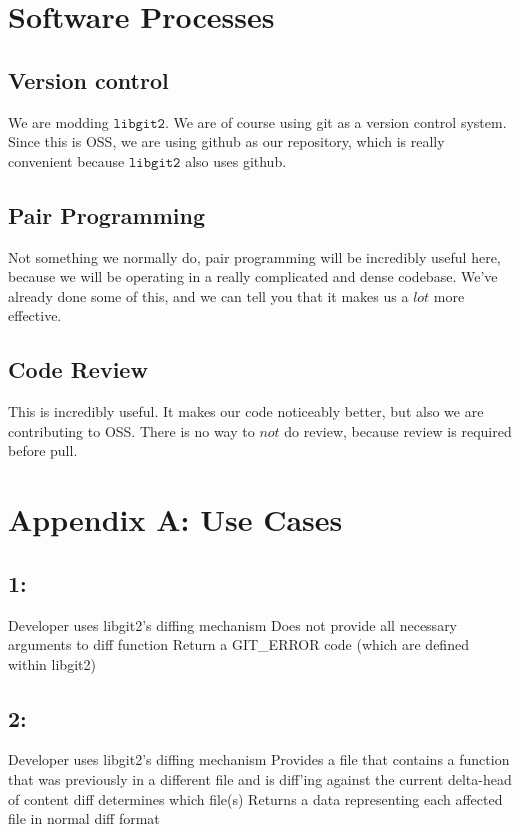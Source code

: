 \documentclass[a4paper]{article}
\begin{document}
\section{Software Processes}

\subsection{Version control} We are modding $\texttt{libgit2}$. We are of course using git as a version control system. Since this is OSS, we are using github as our repository, which is really convenient because $\texttt{libgit2}$ also uses github.

\subsection{Pair Programming} Not something we normally do, pair programming will be incredibly useful here, because we will be operating in a really complicated and dense codebase. We've already done some of this, and we can tell you that it makes us a $\textit{lot}$ more effective.

\subsection{Code Review} This is incredibly useful. It makes our code noticeably better, but also we are contributing to OSS. There is no way to $\textit{not}$ do review, because review is required before pull.

\section{Appendix A: Use Cases}

\subsection*{1:}
Developer uses libgit2's diffing mechanism
Does not provide all necessary arguments to diff function
Return a GIT\_ERROR code (which are defined within libgit2)
\subsection*{2:}
Developer uses libgit2's diffing mechanism
Provides a file that contains a function that was previously in a different file and is diff'ing against the current delta-head of content
diff determines which file(s)
Returns a data representing each affected file in normal diff format
\end{document}
